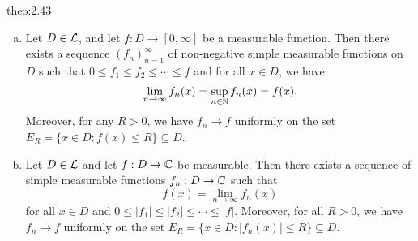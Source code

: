 \begin{theo}{theo:2.43}
    \begin{enumerate}[(a)]
        \item Let $D \in {\cal L}$, and let $f : D \to [0, \infty]$ be a 
        measurable function. Then there exists a sequence $(f_n)_{n=1}^\infty$ 
        of non-negative simple measurable functions on $D$ such that 
        $0 \leq f_1 \leq f_2 \leq \cdots \leq f$ and for all $x \in D$, we have 
        \[ \lim_{n\to\infty} f_n(x) = \sup_{n\in\mathbb{N}} f_n(x) = f(x). \] 
        Moreover, for any $R > 0$, we have $f_n \to f$ uniformly on the 
        set $E_R = \{x \in D : f(x) \leq R\} \subseteq D$. 
        \item Let $D \in {\cal L}$ and let $f : D \to \mathbb{C}$ be measurable. 
        Then there exists a sequence of simple measurable functions 
        $f_n : D \to \mathbb{C}$ such that 
        \[ f(x) = \lim_{n\to\infty} f_n(x) \] 
        for all $x \in D$ and $0 \leq |f_1| \leq |f_2| \leq \cdots \leq |f|$. 
        Moreover, for all $R > 0$, we have $f_n \to f$ uniformly on the set 
        $E_R = \{x \in D : |f_n(x)| \leq R\} \subseteq D$. 
    \end{enumerate}
\end{theo}
